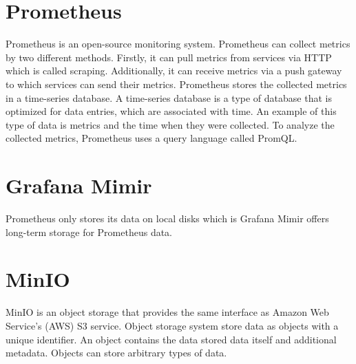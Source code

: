 \section{Prometheus}
Prometheus is an open-source monitoring system.
Prometheus can collect metrics by two different methods.
Firstly, it can pull metrics from services via HTTP which is called scraping.
Additionally, it can receive metrics via a push gateway to which services can send their metrics.
Prometheus stores the collected metrics in a time-series database.
A time-series database is a type of database that is optimized for data entries,
which are associated with time. An example of this type of data is metrics and the time when they were collected.
To analyze the collected metrics, Prometheus uses a query language called PromQL.

\section{Grafana Mimir}
Prometheus only stores its data on local disks which is
Grafana Mimir offers long-term storage for Prometheus data.

\section{MinIO}
MinIO is an object storage that provides the same interface as Amazon Web Service's (AWS) S3 service.
Object storage system store data as objects with a unique identifier. An object contains the data stored
data itself and additional metadata. Objects can store arbitrary types of data.


